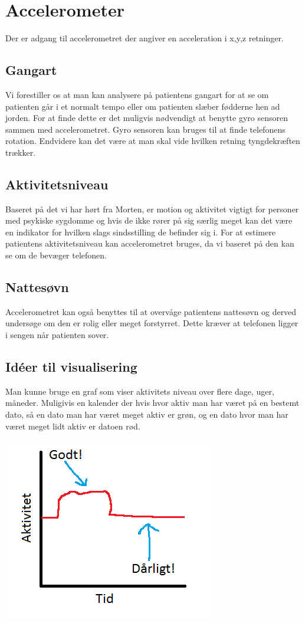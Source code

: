 \section{Accelerometer}
Der er adgang til accelerometret der angiver en acceleration i x,y,z retninger.

\subsection{Gangart}
Vi forestiller os at man kan analysere på patientens gangart for at se om patienten går i et normalt tempo eller om patienten slæber fødderne hen ad jorden.
For at finde dette er det muligvis nødvendigt at benytte gyro sensoren sammen med accelerometret.
Gyro sensoren kan bruges til at finde telefonens rotation.
Endvidere kan det være at man skal vide hvilken retning tyngdekræften trækker.

\subsection{Aktivitetsniveau}
Baseret på det vi har hørt fra Morten, er motion og aktivitet vigtigt for personer med psykiske sygdomme og hvis de ikke rører på sig særlig meget kan det være en indikator for hvilken slags sindsstilling de befinder sig i.
For at estimere patientens aktivitetsniveau kan accelerometret bruges, da vi baseret på den kan se om de bevæger telefonen. 

\subsection{Nattesøvn}
Accelerometret kan også benyttes til at overvåge patientens nattesøvn og derved undersøge om den er rolig eller meget forstyrret.
Dette kræver at telefonen ligger i sengen når patienten sover.


\subsection{Idéer til visualisering} 
Man kunne bruge en graf som viser aktivitets niveau over flere dage, uger, måneder. Muligivis en kalender der hvis hvor aktiv man har været på en bestemt dato, så en dato man har været meget aktiv er grøn, og en dato hvor man har været meget lidt aktiv er datoen rød.

\includegraphics{graphics/aktivitet_billed}

